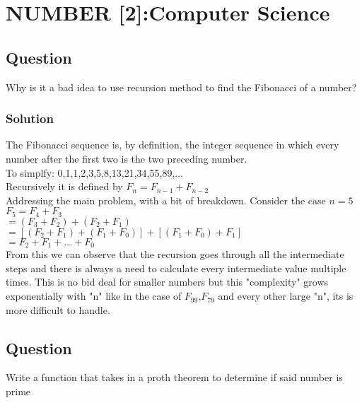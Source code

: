 \documentclass{article}
\begin{document}
\section{NUMBER [2]:Computer Science }
\subsection{Question}
Why is it a bad idea to use recursion method to find the Fibonacci of a number?\\
\subsubsection{Solution}
The Fibonacci sequence is, by definition, the integer sequence in which every number after the first two is the two preceding number.\\
To simplfy: 0,1,1,2,3,5,8,13,21,34,55,89,...\\
Recursively it is defined by $ \displaystyle F_{n}=F_{n-1}+F_{n-2}$\\
Addressing the main problem, with a bit of breakdown. Consider the case $n=5$\\
$F_{5}=F_{4}+F_{3}$\\
$ =(F_{3}+F_{2})+(F_{2}+F_{1})$\\
$ =[(F_{2}+F_{1})+(F_{1}+F_{0})]+[(F_{1}+F_{0})+F_{1}]$\\
$ =F_{2}+F_{1}
+...+F_{0} $ \\
From this we can observe that the recursion goes through all the intermediate steps and there is always a need to calculate every intermediate value multiple times. This is no bid deal for smaller numbers but this "complexity" grows exponentially with "n" like in the case of $F_{99}$,$F_{79}$ and every other large "n", its is more difficult to handle.\\

\subsection{Question}
Write a function that takes in a proth theorem to determine if said number is prime\\
\end{document}
